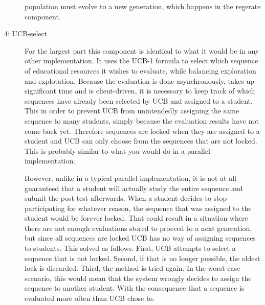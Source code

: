 \begin{description}
		population must evolve to a new generation, which happens in the
		regerate component.
	\item[4: UCB-select] For the largest part this component is identical to
		what it would be in any other implementation. It uses the UCB-1 formula
		to select which sequence of educational resources it wishes to evaluate,
		while balancing exploration and explotation. Because the evaluation is done
		asynchronously, takes up significant time and is client-driven,
		it is necessary to keep track of which sequences have already been
		selected by UCB and assigned to a student. This in order to prevent
		UCB from unintendedly assigning the same sequence to many students,
		simply because the evaluation results have not come back yet. Therefore
		sequences are locked when they are assigned to a student and UCB can
		only choose from the sequences that are not locked. This is probably
		similar to what you would do in a parallel implementation.

		However, unlike in a typical parallel implementation, it is not at all
		guaranteed that a student will actually study the entire sequence
		and submit the post-test afterwards. When a student decides to stop
		participating for whatever reason, the sequence that was assigned to
		the student would be forever locked. That could result in a situation
		where there are not enough evaluations stored to proceed to a next
		generation, but since all sequences are locked UCB has no way of
		assigning sequences to students. This solved as follows. First, UCB
		attempts to select a sequence that is not locked. Second, if that is no
		longer possible, the oldest lock is discarded. Third, the method is
		tried again. In the worst case scenario, this would mean that the
		system wrongly decides to assign the sequence to another student. With
		the consequence that a sequence is evaluated more often than UCB chose
		to.


\end{description}

